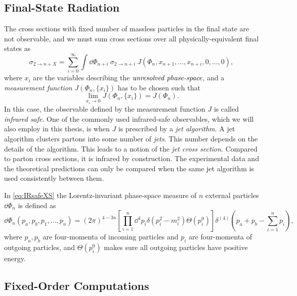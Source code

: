 \subsection{Final-State Radiation}

The cross sections with fixed number of massless particles in the final state are not observable,
and we must sum cross sections over all physically-equivalent final states as
\begin{equation} \label{eq:IRsafeXS}
  \sigma_{2\rightarrow n + X} = %
  \sum_{i=0}^{\infty} \int \dd\Phi_{n+i} ~ \sigma_{2\rightarrow n+i} ~ J(\Phi_{n},x_{n+1},\ldots,x_{n+i},0,\ldots,0),
\end{equation}
where $x_i$ are the variables describing the $\emph{unresolved phase-space}$, and
a \emph{measurement function} $J(\Phi_n, \{x_i\})$ has to be chosen such that
\begin{equation}
  \lim_{x_i\to 0}J(\Phi_n, \{x_i\}) = J(\Phi_n).
  \label{eq:IRsafeConditions}
\end{equation}
In this case, the observable defined by the measurement function $J$ is called \emph{infrared safe}.
One of the commonly used infrared-safe observables, which we will also employ in this thesis,
is when $J$ is prescribed by a \emph{jet algorithm}. A jet algorithm clusters partons
into some number of \emph{jets}. This number depends on the details of the algorithm.
This leads to a notion of the \emph{jet cross section}. Compared to parton cross sections, it is infrared by construction.
The experimental data and the theoretical predictions can only be compared when the same jet algorithm is used consistently between them.

In \cref{eq:IRsafeXS} the Lorentz-invariant phase-space measure of $n$ external particles $\dd\Phi_n$ is defined as
\begin{equation}
  \dd\Phi_n(p_a,p_b,p_1,\ldots,p_n) = (2\pi)^{4-3n} \left[ \prod_{i=1}^{n}\dd^4 p_i \delta(p_i^2-m_i^2) \Theta(p_i^{0}) \right] \delta^{(4)}\left(p_a+p_b - \sum_{i=1}^{n}p_i\right),
  \label{eq:PS}
\end{equation}
where $p_a,p_b$ are four-momenta of incoming particles and $p_i$ are four-momenta of outgoing particles, and
$\Theta(p_i^{0})$ makes sure all outgoing particles have positive energy.


\subsection{Fixed-Order Computations}
\label{sec:fixed_order}


